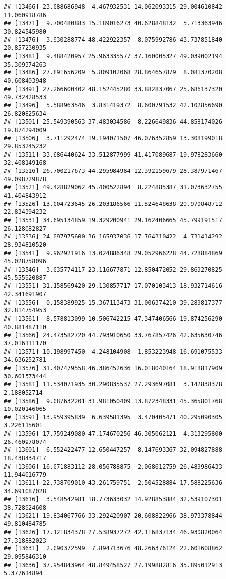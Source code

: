 \documentclass[
]{article}
\begin{document}
\begin{verbatim}
## [13466] 23.088686948  4.467932531 14.062093315 29.004610842 11.060918786
## [13471]  9.700480883 15.189016273 40.628848132  5.713363946 30.824545980
## [13476]  3.930288774 48.422922357  8.075992786 43.737851840 20.857230935
## [13481]  9.488420957 25.963335577 37.160005327 49.039002194 35.309374263
## [13486] 27.891656209  5.809102068 28.864657879  8.081370208 40.608403948
## [13491] 27.266600402 48.152445280 33.882837067 25.686137320 49.732428533
## [13496]  5.588963546  3.831419372  8.600791532 42.102856690 26.820825634
## [13501] 25.549390563 37.483034586  8.226649836 44.858174026 19.874294009
## [13506]  3.711292474 19.194071507 46.076352859 13.308199018 29.853245232
## [13511] 33.686440624 33.512877999 41.417089687 19.978283660 32.408149168
## [13516] 26.700217673 44.295984984 12.392159679 28.387971467 49.098729878
## [13521] 49.428829062 45.400522894  8.224885387 31.073632755 41.404843912
## [13526] 13.004723645 26.203186566 11.524648638 29.970848712 22.834394232
## [13531] 34.695134859 19.329200941 29.162406665 45.799191517 26.128082827
## [13536] 24.097975600 36.165937036 17.764310422  4.731414292 28.934810520
## [13541]  9.962921916 13.024886348 29.052966228 44.728884869 45.028758096
## [13546]  3.035774117 23.116677871 12.850472052 29.869270825 45.555920887
## [13551] 31.158569420 29.130857717 17.070103413 18.932714616 42.341691907
## [13556]  0.158389925 15.367113473 31.006374210 39.289817377 32.814754953
## [13561]  8.578813099 10.506742215 47.347406566 19.874256290 40.881487110
## [13566] 24.473582720 44.793910650 33.767857426 42.635630746 37.016111170
## [13571] 10.198997450  4.248104908  1.853223948 16.691075533 34.636252781
## [13576] 31.407479558 46.386452636 16.018040164 18.918817909 30.601573444
## [13581] 11.534071935 30.290835537 27.293697081  3.142838378  2.188052714
## [13586]  9.087632201 31.981050409 13.872348331 45.365801768 10.020146065
## [13591] 13.959395839  6.639581395  3.470405471 40.295090305  3.226115601
## [13596] 17.759249080 47.174670256 46.305062121  4.313295800 26.460978074
## [13601]  6.552422477 12.650447257  8.147693367 32.094827888 18.438434717
## [13606] 16.071883112 28.056788875  2.068612759 26.489986433 11.944016779
## [13611] 22.738709010 43.261759751  2.504528884 17.588225636 34.691087028
## [13616]  3.548542981 18.773633032 14.928853884 32.539107301 38.728924608
## [13621] 19.834067766 33.292420907 20.608822966 38.973378844 49.810484785
## [13626] 17.121834378 27.538937272 42.116837134 46.930820064 27.318882023
## [13631]  2.090372599  7.894713676 48.266376124 22.601608862 29.095846310
## [13636] 37.954843964 48.849458527 27.199882816 35.895012913  5.377614894

\end{verbatim}
\end{document}
